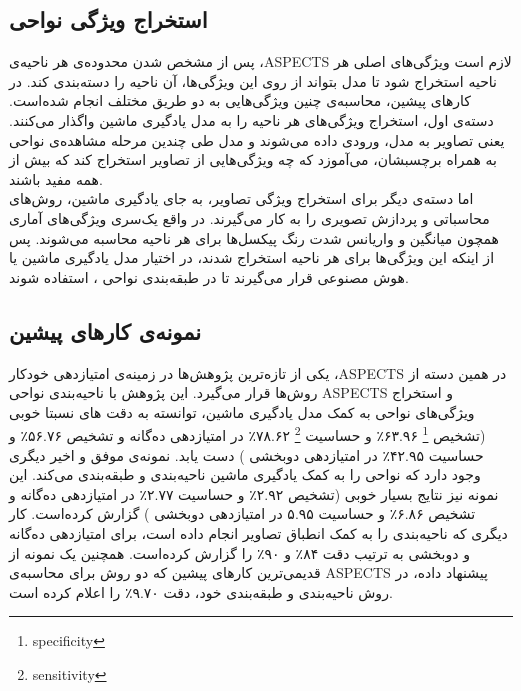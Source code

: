 \subsection{استخراج ویژگی نواحی}
پس از مشخص شدن محدوده‌ی هر ناحیه‌ی ،ASPECTS لازم است ویژگی‌های اصلی هر ناحیه استخراج شود تا مدل بتواند از روی این ویژگی‌ها، آن ناحیه را دسته‌بندی کند.
در کارهای پیشین، محاسبه‌ی چنین ویژگی‌هایی به دو طریق مختلف انجام شده‌است.
دسته‌ی اول، استخراج ویژگی‌های هر ناحیه را به مدل یادگیری ماشین واگذار می‌کنند.
یعنی تصاویر به مدل، ورودی داده می‌شوند و مدل طی چندین مرحله مشاهده‌ی نواحی به همراه برچسبشان، می‌آموزد که چه ویژگی‌هایی از تصاویر استخراج کند که بیش از همه مفید باشند.\\

اما دسته‌ی دیگر برای استخراج ویژگی تصاویر، به جای یادگیری ماشین، روش‌های محاسباتی و پردازش تصویری را به کار می‌گیرند.
در واقع یک‌سری ویژگی‌های آماری همچون میانگین و واریانس شدت رنگ پیکسل‌ها برای هر ناحیه محاسبه می‌شوند.
پس از اینکه این ویژگی‌ها برای هر ناحیه استخراج شدند، 
در اختیار مدل یادگیری ماشین یا هوش مصنوعی قرار می‌گیرند
تا 
در طبقه‌بندی نواحی ، استفاده شوند.

\subsection{نمونه‌ی کارهای پیشین}
یکی از تازه‌ترین پژوهش‌ها در زمینه‌ی امتیاز‌دهی خودکار ،ASPECTS در همین دسته‌ از روش‌ها قرار می‌گیرد.
این پژوهش با ناحیه‌بندی نواحی ASPECTS و استخراج ویژگی‌های نواحی به کمک مدل یادگیری ماشین، توانسته به دقت های نسبتا خوبی 
(تشخیص
\footnote{specificity}
۶۳.۹۶٪
و
حساسیت
\footnote{sensitivity}
۷۸.۶۲٪
در امتیازدهی ده‌گانه و 
تشخیص
۵۶.۷۶٪
و
حساسیت
۴۲.۹۵٪
در امتیازدهی دوبخشی 
)
دست یابد.
نمونه‌ی موفق و اخیر دیگری وجود دارد که نواحی را به کمک یادگیری ماشین ناحیه‌بندی و طبقه‌بندی می‌کند.
این نمونه نیز نتایج بسیار خوبی 
(تشخیص
۲.۹۲٪
و
حساسیت
۲.۷۷٪
در امتیازدهی ده‌گانه و 
تشخیص
۶.۸۶٪
و
حساسیت
۵.۹۵
در امتیازدهی دوبخشی 
)
گزارش کرده‌است.
کار دیگری
که ناحیه‌بندی را به کمک انطباق تصاویر انجام داده است،
برای امتیازدهی ده‌گانه و دو‌بخشی به ترتیب دقت
۸۴٪ 
و 
۹۰٪ 
را گزارش کرده‌است.
همچنین یک نمونه از قدیمی‌ترین کار‌های پیشین که دو روش برای محاسبه‌ی ASPECTS پیشنهاد داده، در روش ناحیه‌بندی و طبقه‌بندی خود،  
دقت
۹.۷۰٪
را اعلام کرده است.
\\

